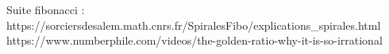 Suite fibonacci :
https://sorciersdesalem.math.cnrs.fr/SpiralesFibo/explications_spirales.html
https://www.numberphile.com/videos/the-golden-ratio-why-it-is-so-irrational

